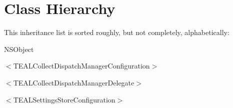 \section{Class Hierarchy}
This inheritance list is sorted roughly, but not completely, alphabetically\+:\begin{DoxyCompactList}
\item N\+S\+Object\begin{DoxyCompactList}
\item {}
\item {}
\end{DoxyCompactList}
\item $<$T\+E\+A\+L\+Collect\+Dispatch\+Manager\+Configuration$>$\begin{DoxyCompactList}
\item {}
\end{DoxyCompactList}
\item $<$T\+E\+A\+L\+Collect\+Dispatch\+Manager\+Delegate$>$\begin{DoxyCompactList}
\item {}
\end{DoxyCompactList}
\item $<$T\+E\+A\+L\+Settings\+Store\+Configuration$>$\begin{DoxyCompactList}
\item {}
\end{DoxyCompactList}
\end{DoxyCompactList}
